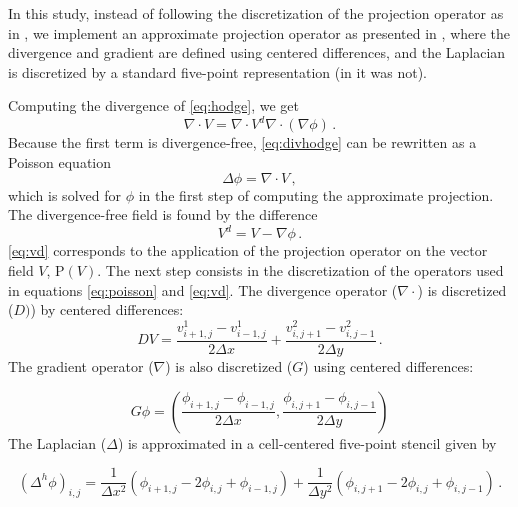 \documentclass{article}
\begin{document}
In this study, instead of following the discretization of the projection operator as in \cite{Bell1991a}, we implement an approximate projection operator as presented in \cite{Lai1993a}, where the divergence and gradient are defined using centered differences, and the Laplacian is discretized by a standard five-point representation (in \cite{Bell1991a} it was not).

Computing the divergence of \eqref{eq:hodge}, we get
\begin{equation}
\label{eq:divhodge}
	\nabla \cdot V = \nabla \cdot V^d \nabla \cdot (\nabla \phi) \,.
\end{equation}
Because the first term is divergence-free, \eqref{eq:divhodge} can be rewritten as a Poisson equation
\begin{equation}
\label{eq:poisson}
	\Delta \phi = \nabla \cdot V  \,,
\end{equation}
which is solved for $\phi$ in the first step of computing the approximate projection. The divergence-free field is found by the difference
\begin{equation}
\label{eq:vd}
	V^d = V - \nabla \phi \,.
\end{equation}
\autoref{eq:vd} corresponds to the application of the projection operator on the vector field $V$, $\mathrm{P}(V)$.
The next step consists in the discretization of the operators used in equations \eqref{eq:poisson} and \eqref{eq:vd}. The divergence operator ($\nabla \cdot$) is discretized ($D)$) by centered differences:
\begin{equation}
\label{eq:discdiv}
	DV = \frac{v_{i + 1, j}^1 - v_{i - 1, j}^1}{2 \Delta x} + \frac{v_{i, j + 1}^2 - v_{i, j - 1}^2}{2 \Delta y} \,.
\end{equation}
The gradient operator ($\nabla$) is also discretized ($G$) using centered differences:

\begin{equation}
\label{eq:discgrad}
	G\phi = \left( \frac{\phi_{i + 1, j} - \phi_{i - 1, j}}{2 \Delta x}, \frac{\phi_{i, j + 1} - \phi_{i, j - 1}}{2 \Delta y} \right)
\end{equation}
The Laplacian ($\Delta$) is approximated in a cell-centered five-point stencil given by

\begin{equation}
\label{eq:disclap}
	(\Delta^h \phi)_{i, j} = \frac{1}{\Delta x^2} (\phi_{i + 1, j} - 2 \phi_{i, j} + \phi_{i - 1, j}) + \frac{1}{\Delta y^2} (\phi_{i, j + 1} - 2 \phi_{i, j} + \phi_{i, j - 1}) \,.
\end{equation}
\end{document}
